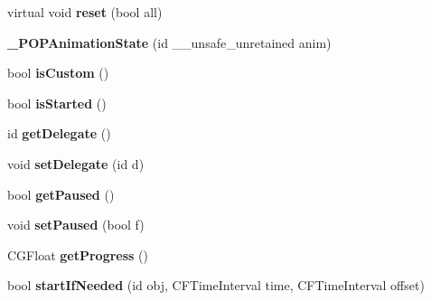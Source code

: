 \begin{DoxyCompactItemize}
\mbox{\label{struct___p_o_p_animation_state_a7b4acd646f8e97c1e07c906c04e36d94}} 
virtual void {\bfseries reset} (bool all)
\item 
\mbox{\label{struct___p_o_p_animation_state_a70cac0cdc5a3c24e9dd8bc6e60f5845a}} 
{\bfseries \+\_\+\+P\+O\+P\+Animation\+State} (id \+\_\+\+\_\+unsafe\+\_\+unretained anim)
\item 
\mbox{\label{struct___p_o_p_animation_state_a27c516881f0a454488a8d02dfcb6ef67}} 
bool {\bfseries is\+Custom} ()
\item 
\mbox{\label{struct___p_o_p_animation_state_a3f134844d40e03c3216347f9974cd4bd}} 
bool {\bfseries is\+Started} ()
\item 
\mbox{\label{struct___p_o_p_animation_state_ad9e4142f0d09a56ec083f77cb0cb04fe}} 
id {\bfseries get\+Delegate} ()
\item 
\mbox{\label{struct___p_o_p_animation_state_adee293cc081cbbfb6e0ee437a874eeca}} 
void {\bfseries set\+Delegate} (id d)
\item 
\mbox{\label{struct___p_o_p_animation_state_a32a5c375f98b459ebecb3c8e0feac5b3}} 
bool {\bfseries get\+Paused} ()
\item 
\mbox{\label{struct___p_o_p_animation_state_a905f2589ff378d83c489b579b1010e58}} 
void {\bfseries set\+Paused} (bool f)
\item 
\mbox{\label{struct___p_o_p_animation_state_a3b660d839684e968b10696314a3bf9f0}} 
C\+G\+Float {\bfseries get\+Progress} ()
\item 
\mbox{\label{struct___p_o_p_animation_state_a47dba1cab772bd9278e0b7b60d38763f}} 
bool {\bfseries start\+If\+Needed} (id obj, C\+F\+Time\+Interval time, C\+F\+Time\+Interval offset)
\item 
\mbox{\label{struct___p_o_p_animation_state_aa757250389df94b8bdf0549d4586a8ba}} 

\end{DoxyCompactItemize}
